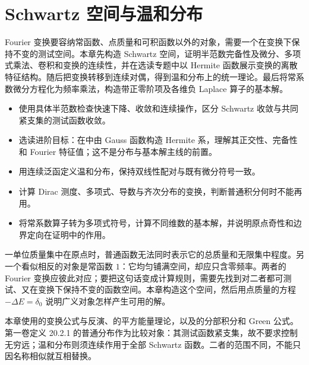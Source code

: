 \chapter{Schwartz 空间与温和分布}
\label{b2:ch:05}
\begin{chapterabstract}
Fourier 变换要容纳常函数、点质量和可积函数以外的对象，需要一个在变换下保持不变的测试空间。本章先构造 Schwartz 空间，证明半范数完备性及微分、多项式乘法、卷积和变换的连续性，并在选读专题中以 Hermite 函数展示变换的离散特征结构。随后把变换转移到连续对偶，得到温和分布上的统一理论。最后将常系数微分方程化为频率乘法，构造带正零阶项及各维负 Laplace 算子的基本解。
\end{chapterabstract}
\begin{learninggoals}
\begin{itemize}
\item\label{b2:item:05-goal-schwartz}使用具体半范数检查快速下降、收敛和连续操作，区分 Schwartz 收敛与共同紧支集的测试函数收敛。
\item\label{b2:item:05-goal-hermite}选读进阶目标：在中由 Gauss 函数构造 Hermite 系，理解其正交性、完备性和 Fourier 特征值；这不是分布与基本解主线的前置。
\item\label{b2:item:05-goal-tempered}用连续泛函定义温和分布，保持双线性配对与既有微分符号一致。
\item\label{b2:item:05-goal-examples}计算 Dirac 测度、多项式、导数与齐次分布的变换，判断普通积分何时不能再用。
\item\label{b2:item:05-goal-fundamental}将常系数算子转为多项式符号，计算不同维数的基本解，并说明原点奇性和边界定向在证明中的作用。
\end{itemize}
\end{learninggoals}

一单位质量集中在原点时，普通函数无法同时表示它的总质量和无限集中程度。另一个看似相反的对象是常函数 \(1\)：它均匀铺满空间，却应只含零频率。两者的 Fourier 变换应彼此对应；要把这句话变成计算规则，需要先找到对二者都可测试、又在变换下保持不变的函数空间。本章构造这个空间，然后用点质量的方程 \(-\Delta E=\delta_0\) 说明广义对象怎样产生可用的解。

\ProseParagraphBreak

本章使用的变换公式与反演、的平方能量理论，以及的分部积分和 Green 公式。第一卷定义 20.2.1 的普通分布作为比较对象：其测试函数紧支集，故不要求控制无穷远；温和分布则须连续作用于全部 Schwartz 函数。二者的范围不同，不能只因名称相似就互相替换。


